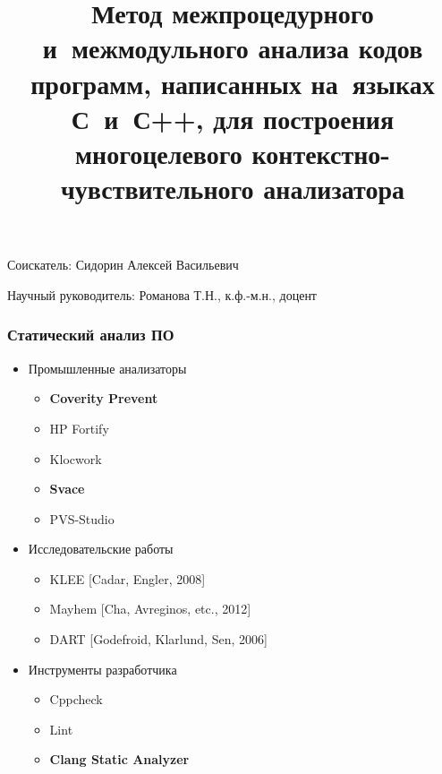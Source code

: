 \documentclass[hyperref={pdfpagelabels=false},10pt,gray]{beamer}
\title{Метод межпроцедурного и~межмодульного анализа кодов программ, написанных на~языках  С~и~С++, для построения многоцелевого контекстно-чувствительного анализатора}
\begin{document}
\begin{frame}
  \bigskip\bigskip
  \bigskip
  \begin{flushright}%

  Соискатель: Сидорин Алексей Васильевич
  
  Научный руководитель: Романова Т.Н., к.ф.-м.н., доцент
  \end{flushright}
  \bigskip

\end{frame}


\begin{frame}
\frametitle{Статический анализ ПО}
\begin{itemize}
  \item Промышленные анализаторы
  \begin{itemize}
    \item \textbf{Coverity Prevent}
    \item HP Fortify
    \item Klocwork
    \item \textbf{Svace}
    \item PVS-Studio
  \end{itemize}
  \item Исследовательские работы
  \begin{itemize}
  \item KLEE [Cadar, Engler, 2008]
  \item Mayhem [Cha, Avreginos, etc., 2012]
  \item DART [Godefroid, Klarlund, Sen, 2006]
  \end{itemize}
  \item Инструменты разработчика
    \begin{itemize}
    \item Cppcheck
    \item Lint
    \item \textbf{Clang Static Analyzer}
    \end{itemize}

\end{itemize}
\end{frame}
\end{document}
